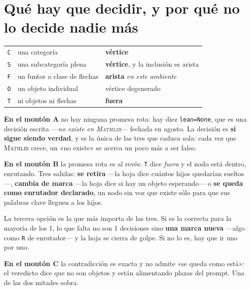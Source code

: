 \documentclass[10pt,a4paper]{article}
\newcommand{\Mathlib}{\textsc{Mathlib}}
\begin{document}
\section*{Qué hay que decidir, y por qué no lo decide nadie más}
\noindent\small\begin{tabular}{@{}ll l@{}}\toprule
\texttt{C} & una categoría & \textbf{vértice}\\
\texttt{S} & una subcategoría plena & \textbf{vértice}, y la inclusión es arista\\
\texttt{F} & un funtor o clase de flechas & \textbf{arista} \emph{en este ambiente}\\
\texttt{O} & un objeto individual & vértice degenerado\\
\texttt{T} & ni objetos ni flechas & \textbf{fuera}\\
\bottomrule\end{tabular}\par\medskip

\noindent\textbf{En el montón A} no hay ninguna promesa rota: hay diez
\texttt{lean=None}, que es una decisión escrita —\emph{no existe en
\Mathlib{}}— fechada en agosto. La decisión es \textbf{si sigue siendo
verdad}, y es la única de las tres que caduca sola: cada vez que \Mathlib{}
crece, un «no existe» se acerca un poco más a ser falso.\par\medskip
\noindent\textbf{En el montón B} la promesa rota es al revés: \texttt{T} dice
\emph{fuera} y el nodo está dentro, enrutando. Tres salidas: \textbf{se
retira} —la hoja dice cuántos hijos quedarían sueltos—, \textbf{cambia de
marca} —la hoja dice si hay un objeto esperando— o \textbf{se queda como
enrutador declarado}, un nodo sin voz que existe sólo para que sus palabras
clave lleguen a los hijos.\par\medskip

\begin{aviso}\small 
La tercera opción es la que más importa de las tres. Si es la correcta para la mayoría de los 1, lo que falta no son 1 decisiones sino \textbf{una marca nueva} —algo como \texttt{R} de enrutador— y la hoja se cierra de golpe. Si no lo es, hay que ir uno por uno.
\end{aviso}

\noindent\textbf{En el montón C} la contradicción es exacta y no admite «se
queda como está»: el veredicto dice que no son objetos y están alimentando
plazas del prompt. Una de las dos mitades sobra.\par\medskip
\end{document}
